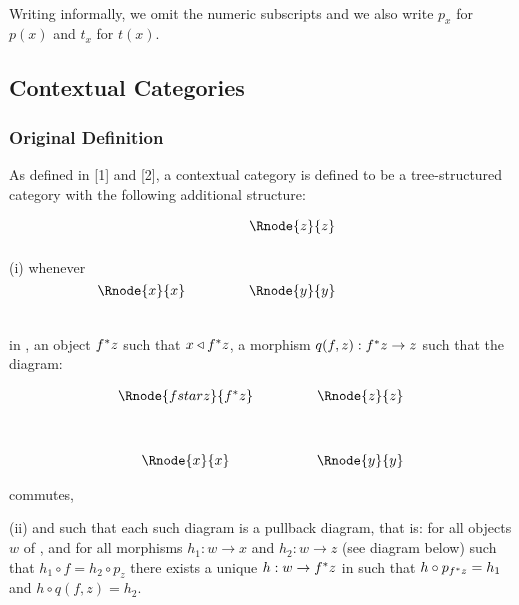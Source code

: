 \documentclass[10pt,a4paper]{article}
\begin{document}
\vspace{.05cm}  \\


Writing informally, we omit the numeric subscripts and we also write $p_x$ for $p(x)$ and $t_x$ for $t(x)$.

\subsection{Contextual Categories}

\subsubsection{Original Definition}

As defined in [1] and [2], a contextual category is defined to be a tree-structured category 
 with the following additional structure:

\noindent 
(i) whenever
$
\begin{array}{cp{.9cm}c}
            & & \Rnode{z}{z} \\ [1.2cm]
\Rnode{x}{x}& & \Rnode{y}{y} \\ [0.5cm]
\end{array}
$

in , an object $f ^* z$ such that $x \triangleleft f ^* z$, a morphism $q(f,z): f ^* z \rightarrow z$ such that the diagram:

\vspace{3mm}
\begin{center}
\begin{displaymath}
\begin{array}{cp{.9cm}c}
\Rnode{fstarz}{f^*z} & & \Rnode{z}{z}\\ [1.2cm]
\Rnode{x}{x}         & & \Rnode{y}{y}
\end{array}
\end{displaymath}
\end{center}
commutes, 

\noindent
(ii) and such that each such diagram is a pullback diagram, that is: for all objects $w$ of , and for all
morphisms $h_1: w \rightarrow x$ and $h_2: w \rightarrow z$ (see diagram below) such that
$h_1 \circ f = h_2 \circ p_z$ 
there exists a unique $h:w \rightarrow f ^* z$ in  such that
$h \circ p_{f ^* z} = h_1$ and $h \circ q(f,z) = h_2$.
\end{document}
